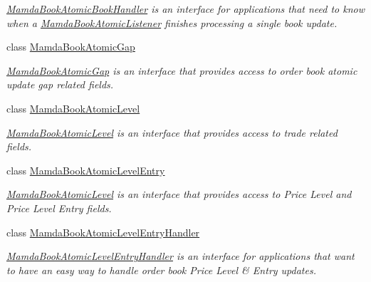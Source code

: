 \begin{CompactItemize}
\begin{CompactList}\small\item\em \hyperlink{classWombat_1_1MamdaBookAtomicBookHandler}{Mamda\-Book\-Atomic\-Book\-Handler} is an interface for applications that need to know when a \hyperlink{classWombat_1_1MamdaBookAtomicListener}{Mamda\-Book\-Atomic\-Listener} finishes processing a single book update. \item\end{CompactList}\item 
class \hyperlink{classWombat_1_1MamdaBookAtomicGap}{Mamda\-Book\-Atomic\-Gap}
\begin{CompactList}\small\item\em \hyperlink{classWombat_1_1MamdaBookAtomicGap}{Mamda\-Book\-Atomic\-Gap} is an interface that provides access to order book atomic update gap related fields. \item\end{CompactList}\item 
class \hyperlink{classWombat_1_1MamdaBookAtomicLevel}{Mamda\-Book\-Atomic\-Level}
\begin{CompactList}\small\item\em \hyperlink{classWombat_1_1MamdaBookAtomicLevel}{Mamda\-Book\-Atomic\-Level} is an interface that provides access to trade related fields. \item\end{CompactList}\item 
class \hyperlink{classWombat_1_1MamdaBookAtomicLevelEntry}{Mamda\-Book\-Atomic\-Level\-Entry}
\begin{CompactList}\small\item\em \hyperlink{classWombat_1_1MamdaBookAtomicLevel}{Mamda\-Book\-Atomic\-Level} is an interface that provides access to Price Level and Price Level Entry fields. \item\end{CompactList}\item 
class \hyperlink{classWombat_1_1MamdaBookAtomicLevelEntryHandler}{Mamda\-Book\-Atomic\-Level\-Entry\-Handler}
\begin{CompactList}\small\item\em \hyperlink{classWombat_1_1MamdaBookAtomicLevelEntryHandler}{Mamda\-Book\-Atomic\-Level\-Entry\-Handler} is an interface for applications that want to have an easy way to handle order book Price Level \& Entry updates. \item\end{CompactList}\item 

\end{CompactItemize}
